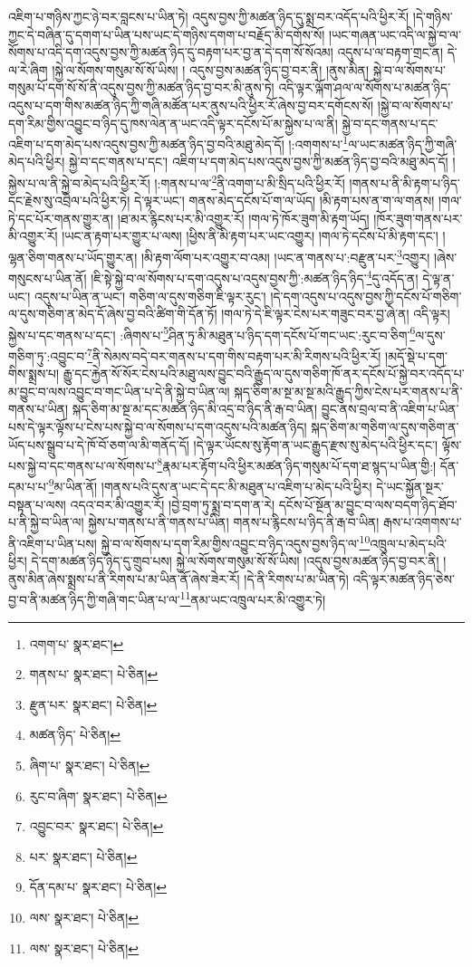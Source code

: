 འཇིག་པ་གཉིས་ཀྱང་ཉེ་བར་བླངས་པ་ཡིན་ཏེ། འདུས་བྱས་ཀྱི་མཚན་ཉིད་དུ་སྨྲ་བར་འདོད་པའི་ཕྱིར་རོ། །དེ་གཉིས་ཀྱང་དེ་བཞིན་དུ་དགག་པ་ཡིན་པས་ཡང་དེ་གཉིས་དགག་པ་བརྗོད་མི་དགོས་སོ། །ཡང་གཞན་ཡང་འདི་ལ་སྐྱེ་བ་ལ་སོགས་པ་འདི་དག་འདུས་བྱས་ཀྱི་མཚན་ཉིད་དུ་བརྟག་པར་བྱ་ན་དེ་དག་སོ་སོའམ། འདུས་པ་ལ་བརྟག་གྲང་ན། དེ་ལ་རེ་ཞིག །སྐྱེ་ལ་སོགས་གསུམ་སོ་སོ་ཡིས། །
འདུས་བྱས་མཚན་ཉིད་བྱ་བར་ནི། །ནུས་མིན། སྐྱེ་བ་ལ་སོགས་པ་གསུམ་པོ་དག་སོ་སོ་ནི་འདུས་བྱས་ཀྱི་མཚན་ཉིད་བྱ་བར་མི་ནུས་ཏེ། འདི་ལྟར་ལྐོག་ཤལ་ལ་སོགས་པ་མཚན་ཉིད་འདུས་པ་དག་གིས་མཚན་ཉིད་ཀྱི་གཞི་མཚོན་པར་ནུས་པའི་ཕྱིར་རོ་ཞེས་བྱ་བར་དགོངས་སོ། །སྐྱེ་བ་ལ་སོགས་པ་དག་རིམ་གྱིས་འབྱུང་བ་ཉིད་དུ་ཁས་ལེན་ན་ཡང་འདི་ལྟར་དངོས་པོ་མ་སྐྱེས་པ་ལ་ནི། སྐྱེ་བ་དང་གནས་པ་དང་འཇིག་པ་དག་མེད་པས་འདུས་བྱས་ཀྱི་མཚན་ཉིད་བྱ་བའི་མཐུ་མེད་དོ། །:འགགས་པ་\footnote{འགག་པ་  སྣར་ཐང་། }ལ་ཡང་མཚན་ཉིད་ཀྱི་གཞི་མེད་པའི་ཕྱིར། སྐྱེ་བ་དང་གནས་པ་དང་། འཇིག་པ་དག་མེད་པས་འདུས་བྱས་ཀྱི་མཚན་ཉིད་བྱ་བའི་མཐུ་མེད་དོ། །སྐྱེས་པ་ལ་ནི་སྐྱེ་བ་མེད་པའི་ཕྱིར་རོ། །:གནས་པ་ལ་\footnote{གནས་པ་  སྣར་ཐང་།  པེ་ཅིན། }ནི་འགག་པ་མི་སྲིད་པའི་ཕྱིར་རོ། །གནས་པ་ནི་མི་རྟག་པ་ཉིད་དང་རྗེས་སུ་འབྲེལ་པའི་ཕྱིར་ཏེ། དེ་ལྟར་ཡང་། གནས་མེད་དངོས་པོ་ག་ལ་ཡོད། །མི་རྟག་པས་ན་ག་ལ་གནས། །གལ་ཏེ་དང་པོར་གནས་གྱུར་ན། །ཐ་མར་རྙིངས་པར་མི་འགྱུར་རོ། །གལ་ཏེ་ཁོར་ཟུག་མི་རྟག་ཡོད། །ཁོར་ཟུག་གནས་པར་མི་འགྱུར་རོ། །ཡང་ན་རྟག་པར་གྱུར་པ་ལས། །ཕྱིས་ནི་མི་རྟག་པར་ཡང་འགྱུར། །གལ་ཏེ་དངོས་པོ་མི་རྟག་དང་། །ལྷན་ཅིག་གནས་པ་ཡོད་གྱུར་ན། །མི་རྟག་ལོག་པར་འགྱུར་བ་འམ། །ཡང་ན་གནས་པ་:བརྫུན་པར་\footnote{རྫུན་པར་  སྣར་ཐང་།  པེ་ཅིན། }འགྱུར། །ཞེས་གསུངས་པ་ཡིན་ནོ། །ཇི་སྟེ་སྐྱེ་བ་ལ་སོགས་པ་དག་འདུས་པ་འདུས་བྱས་ཀྱི་:མཚན་ཉིད་ཉིད་\footnote{མཚན་ཉིད་  པེ་ཅིན། }དུ་འདོད་ན། དེ་ལྟ་ན་ཡང་། འདུས་པ་ཡིན་ན་ཡང་། གཅིག་ལ་དུས་གཅིག་ཇི་ལྟར་རུང་། །དེ་དག་འདུས་པ་འདུས་བྱས་ཀྱི་དངོས་པོ་གཅིག་ལ་དུས་གཅིག་ན་མེད་དོ་ཞེས་བྱ་བའི་ཚིག་གི་དོན་ཏོ། །གལ་ཏེ་དེ་ཇི་ལྟར་ངེས་པར་གཟུང་བར་བྱ་ཞེ་ན། འདི་ལྟར། སྐྱེས་པ་དང་གནས་པ་དང་། :ཞིགས་པ་\footnote{ཞིག་པ་  སྣར་ཐང་།  པེ་ཅིན། }ཤིན་ཏུ་མི་མཐུན་པ་ཉིད་དག་དངོས་པོ་གང་ཡང་:རུང་བ་ཅིག་\footnote{རུང་བ་ཞིག་  སྣར་ཐང་།  པེ་ཅིན། }ལ་དུས་གཅིག་ཏུ་:འབྱུང་བ་\footnote{འབྱུང་བར་  སྣར་ཐང་།  པེ་ཅིན། }ནི་སེམས་བདེ་བར་གནས་པ་དག་གིས་བརྟག་པར་མི་རིགས་པའི་ཕྱིར་རོ། །མདོ་སྡེ་པ་དག་གིས་སྨྲས་པ། རྒྱུ་དང་རྐྱེན་སོ་སོར་ངེས་པའི་མཐུ་ལས་བྱུང་བའི་རྒྱུད་ལ་དུས་གཅིག་ཁོ་ནར་དངོས་པོ་སྐྱེ་བར་འདོད་པ་མ་བྱུང་བ་ལས་འབྱུང་བ་གང་ཡིན་པ་དེ་ནི་སྐྱེ་བ་ཡིན་ལ། སྐད་ཅིག་མ་སྔ་མ་སྔ་མའི་རྒྱུད་ཀྱིས་ངེས་པར་གནས་པ་ནི་གནས་པ་ཡིན། སྐད་ཅིག་མ་སྔ་མ་དང་མཚན་ཉིད་མི་འདྲ་བ་ཉིད་ནི་རྒ་བ་ཡིན། བྱུང་ནས་བྲལ་བ་ནི་འཇིག་པ་ཡིན་པས་དེ་ལྟར་ལྟོས་པ་ངེས་པས་སྐྱེ་བ་ལ་སོགས་པ་དག་འདུས་པའི་མཚན་ཉིད། སྐད་ཅིག་མ་གཅིག་ལ་དུས་གཅིག་ན་ཡོད་པས་སྒྲུབ་པ་དེ་ཁོ་བོ་ཅག་ལ་མི་གནོད་དོ། །དེ་ལྟར་ཡོངས་སུ་རྟོག་ན་ཡང་རྒྱུད་རྫས་སུ་མེད་པའི་ཕྱིར་དང་། ལྟོས་པས་སྐྱེ་བ་དང་གནས་པ་ལ་སོགས་པ་\footnote{པར་  སྣར་ཐང་།  པེ་ཅིན། }རྣམ་པར་རྟོག་པའི་ཕྱིར་མཚན་ཉིད་གསུམ་པོ་དག་ཐ་སྙད་པ་ཡིན་གྱི:། དོན་དམ་པ་པ་\footnote{དོན་དམ་པ་  སྣར་ཐང་།  པེ་ཅིན། }མ་ཡིན་ནོ། །གནས་པའི་དུས་ན་ཡང་དེ་དང་མི་མཐུན་པ་འཇིག་པ་མེད་པའི་ཕྱིར། དེ་ཡང་སྐྱོན་སྔར་བསྟན་པ་ལས། འདའ་བར་མི་འགྱུར་རོ། །བྱེ་བྲག་ཏུ་སྨྲ་བ་དག་ན་རེ། དངོས་པོ་སྔོན་མ་བྱུང་བ་ལས་བདག་ཉིད་ཐོབ་པ་ནི་སྐྱེ་བ་ཡིན་ལ། སྐྱེས་པ་གནས་པ་ནི་གནས་པ་ཡིན། གནས་པ་རྙིངས་པ་ཉིད་ནི་རྒ་བ་ཡིན། རྒས་པ་འགགས་པ་ནི་འཇིག་པ་ཡིན་པས། སྐྱེ་བ་ལ་སོགས་པ་དག་རིམ་གྱིས་འབྱུང་བ་ཉིད་འདུས་བྱས་ཉིད་ལ་\footnote{ལས་  སྣར་ཐང་།  པེ་ཅིན། }འཁྲུལ་པ་མེད་པའི་ཕྱིར། དེ་དག་མཚན་ཉིད་ཉིད་དུ་གྲུབ་པས། སྐྱེ་ལ་སོགས་གསུམ་སོ་སོ་ཡིས། །འདུས་བྱས་མཚན་ཉིད་བྱ་བར་ནི། །ནུས་མིན་ཞེས་སྨྲས་པ་ནི་རིགས་པ་མ་ཡིན་ནོ་ཞེས་ཟེར་རོ། །དེ་ནི་རིགས་པ་མ་ཡིན་ཏེ། འདི་ལྟར་མཚན་ཉིད་ཅེས་བྱ་བ་ནི་མཚན་ཉིད་ཀྱི་གཞི་གང་ཡིན་པ་ལ་\footnote{ལས་  སྣར་ཐང་།  པེ་ཅིན། }ནམ་ཡང་འཁྲུལ་པར་མི་འགྱུར་ཏེ། 